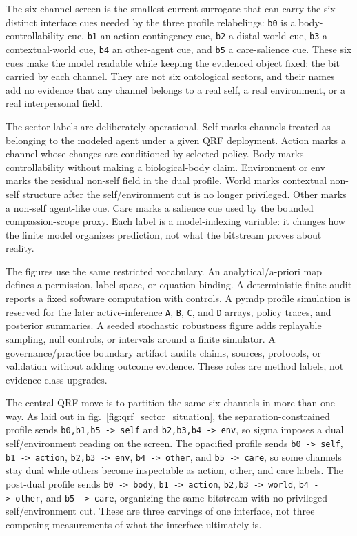 \documentclass[
]{article}
\begin{document}
The six-channel screen is the smallest current surrogate that can carry
the six distinct interface cues needed by the three profile relabelings:
\texttt{b0} is a body-controllability cue, \texttt{b1} an
action-contingency cue, \texttt{b2} a distal-world cue, \texttt{b3} a
contextual-world cue, \texttt{b4} an other-agent cue, and \texttt{b5} a
care-salience cue. These six cues make the model readable while keeping
the evidenced object fixed: the bit carried by each channel. They are
not six ontological sectors, and their names add no evidence that any
channel belongs to a real self, a real environment, or a real
interpersonal field.

The sector labels are deliberately operational. Self marks channels
treated as belonging to the modeled agent under a given QRF deployment.
Action marks a channel whose changes are conditioned by selected policy.
Body marks controllability without making a biological-body claim.
Environment or env marks the residual non-self field in the dual
profile. World marks contextual non-self structure after the
self/environment cut is no longer privileged. Other marks a non-self
agent-like cue. Care marks a salience cue used by the bounded
compassion-scope proxy. Each label is a model-indexing variable: it
changes how the finite model organizes prediction, not what the
bitstream proves about reality.

The figures use the same restricted vocabulary. An analytical/a-priori
map defines a permission, label space, or equation binding. A
deterministic finite audit reports a fixed software computation with
controls. A pymdp profile simulation is reserved for the later
active-inference \texttt{A}, \texttt{B}, \texttt{C}, and \texttt{D}
arrays, policy traces, and posterior summaries. A seeded stochastic
robustness figure adds replayable sampling, null controls, or intervals
around a finite simulator. A governance/practice boundary artifact
audits claims, sources, protocols, or validation without adding outcome
evidence. These roles are method labels, not evidence-class upgrades.

The central QRF move is to partition the same six channels in more than
one way. As laid out in fig.~\ref{fig:qrf_sector_situation}, the
separation-constrained profile sends
\texttt{b0,b1,b5\ -\textgreater{}\ self} and
\texttt{b2,b3,b4\ -\textgreater{}\ env}, so sigma imposes a dual
self/environment reading on the screen. The opacified profile sends
\texttt{b0\ -\textgreater{}\ self},
\texttt{b1\ -\textgreater{}\ action},
\texttt{b2,b3\ -\textgreater{}\ env},
\texttt{b4\ -\textgreater{}\ other}, and
\texttt{b5\ -\textgreater{}\ care}, so some channels stay dual while
others become inspectable as action, other, and care labels. The
post-dual profile sends \texttt{b0\ -\textgreater{}\ body},
\texttt{b1\ -\textgreater{}\ action},
\texttt{b2,b3\ -\textgreater{}\ world},
\texttt{b4\ -\textgreater{}\ other}, and
\texttt{b5\ -\textgreater{}\ care}, organizing the same bitstream with
no privileged self/environment cut. These are three carvings of one
interface, not three competing measurements of what the interface
ultimately is.
\end{document}
